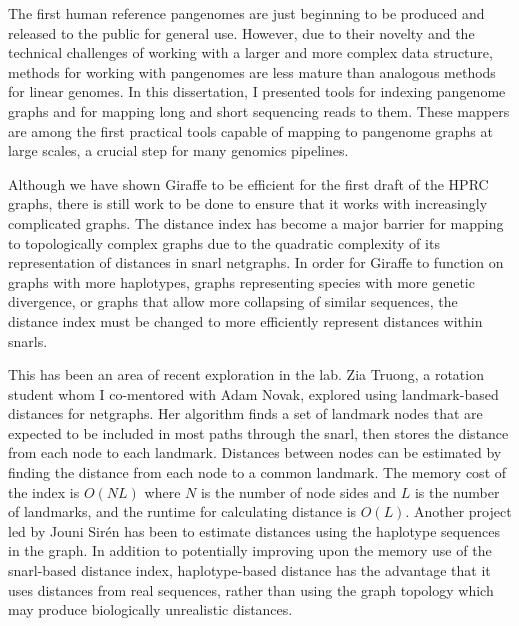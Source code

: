 \documentclass[11pt]{ucscthesis}
\begin{document}
The first human reference pangenomes are just beginning to be produced and released to the public for general use.
However, due to their novelty and the technical challenges of working with a larger and more complex data structure, methods for working with pangenomes are less mature than analogous methods for linear genomes.
In this dissertation, I presented tools for indexing pangenome graphs and for mapping long and short sequencing reads to them.
These mappers are among the first practical tools capable of mapping to pangenome graphs at large scales, a crucial step for many genomics pipelines.

Although we have shown Giraffe to be efficient for the first draft of the HPRC graphs, there is still work to be done to ensure that it works with increasingly complicated graphs.
The distance index has become a major barrier for mapping to topologically complex graphs due to the quadratic complexity of its representation of distances in snarl netgraphs.
In order for Giraffe to function on graphs with more haplotypes, graphs representing species with more genetic divergence, or graphs that allow more collapsing of similar sequences, the distance index must be changed to more efficiently represent distances within snarls.

This has been an area of recent exploration in the lab.
Zia Truong, a rotation student whom I co-mentored with Adam Novak, explored using landmark-based distances for netgraphs.
Her algorithm finds a set of landmark nodes that are expected to be included in most paths through the snarl, then stores the distance from each node to each landmark.
Distances between nodes can be estimated by finding the distance from each node to a common landmark.
The memory cost of the index is $O(NL)$ where $N$ is the number of node sides and $L$ is the number of landmarks, and the runtime for calculating distance is $O(L)$.    
Another project led by Jouni Sirén has been to estimate distances using the haplotype sequences in the graph.
In addition to potentially improving upon the memory use of the snarl-based distance index, haplotype-based distance has the advantage that it uses distances from real sequences, rather than using the graph topology which may produce biologically unrealistic distances.
\end{document}
